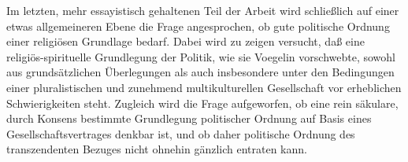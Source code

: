 Im letzten, mehr essayistisch gehaltenen Teil der Arbeit wird schließlich auf
einer etwas allgemeineren Ebene die Frage angesprochen, ob gute politische
Ordnung einer religiösen Grundlage bedarf. Dabei wird zu zeigen versucht, daß
eine religiös-spirituelle Grundlegung der Politik, wie sie Voegelin
vorschwebte, sowohl aus grundsätzlichen Überlegungen als auch insbesondere
unter den Bedingungen einer pluralistischen und zunehmend multikulturellen
Gesellschaft vor erheblichen Schwierigkeiten steht. Zugleich wird die Frage
aufgeworfen, ob eine rein säkulare, durch Konsens bestimmte Grundlegung
politischer Ordnung auf Basis eines Gesellschaftsvertrages denkbar ist, und ob
daher politische Ordnung des transzendenten Bezuges nicht ohnehin gänzlich
entraten kann.



